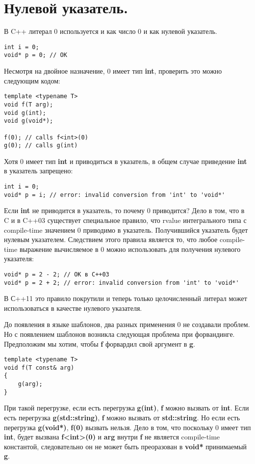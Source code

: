 \section{Нулевой указатель.}
В C++ литерал 0 используется и как число 0 и как нулевой указатель. 
\begin{verbatim}
int i = 0;
void* p = 0; // OK
\end{verbatim}
Несмотря на двойное назначение, 0 имеет тип {\bf int}, проверить это можно следующим кодом:
\begin{verbatim}
template <typename T>
void f(T arg);
void g(int);
void g(void*);

f(0); // calls f<int>(0)
g(0); // calls g(int)
\end{verbatim}
Хотя 0 имеет тип {\bf int} и приводиться в указатель, в общем случае приведение {\bf int} в указатель запрещено:
\begin{verbatim}
int i = 0;
void* p = i; // error: invalid conversion from 'int' to 'void*'
\end{verbatim}
Если {\bf int} не приводится в указатель, то почему 0 приводится? Дело в том, что в C и в C++03 существует специальное правило, что rvalue интегрального типа с compile-time значением 0 приводимо в указатель. Получившийся указатель будет нулевым указателем. Следствием этого правила является то, что любое compile-time выражение вычисляемое в 0 можно использовать для получения нулевого указателя:
\begin{verbatim}
void* p = 2 - 2; // OK в C++03
void* p = 2 + 2; // error: invalid conversion from 'int' to 'void*'
\end{verbatim}
В С++11 это правило покрутили и теперь только целочисленный литерал может использоваться в качестве нулевого указателя.

До появления в языке шаблонов, два разных применения 0 не создавали проблем. Но с появлением шаблонов возникла следующая проблема при форвандинге. Предположим мы хотим, чтобы {\bf f} форвардил свой аргумент в {\bf g}.
\begin{verbatim}
template <typename T>
void f(T const& arg)
{
    g(arg);
}
\end{verbatim}
При такой перегрузке, если есть перегрузка {\bf g(int)}, {\bf f} можно вызвать от {\bf int}. Если есть перегрузка {\bf g(std::string)}, {\bf f} можно вызвать от {\bf std::string}. Но если есть перегрузка {\bf g(void*)}, {\bf f(0)} вызвать нельзя. Дело в том, что поскольку 0 имеет тип {\bf int}, будет вызвана {\bf f<int>(0)} и {\bf arg} внутри {\bf f} не является compile-time константой, следовательно он не может быть преоразован в {\bf void*} принимаемый {\bf g}.

